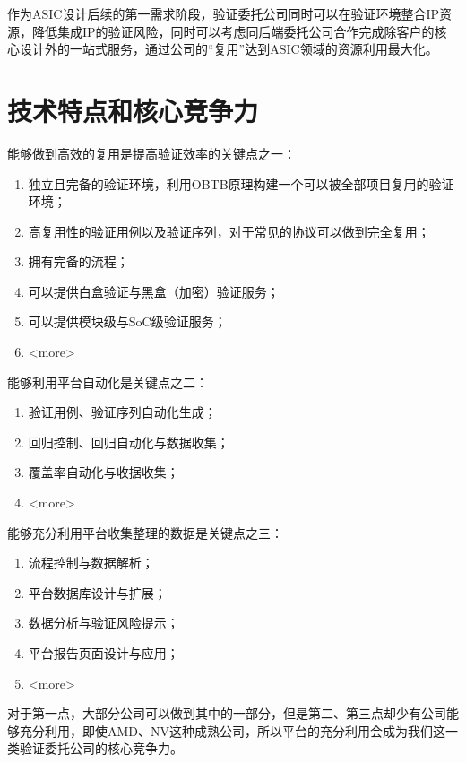 \documentclass[a4paper,11pt]{article}
\begin{document}
作为ASIC设计后续的第一需求阶段，验证委托公司同时可以在验证环境整合IP资源，降低集成IP的验证风险，同时可以考虑同后端委托公司合作完成除客户的核心设计外的一站式服务，通过公司的“复用”达到ASIC领域的资源利用最大化。
\pagebreak

\section{技术特点和核心竞争力}
能够做到高效的复用是提高验证效率的关键点之一：
\begin{enumerate}
\item 独立且完备的验证环境，利用OBTB原理构建一个可以被全部项目复用的验证环境；
\item 高复用性的验证用例以及验证序列，对于常见的协议可以做到完全复用；
\item 拥有完备的流程；
\item 可以提供白盒验证与黑盒（加密）验证服务；
\item 可以提供模块级与SoC级验证服务；
\item <more>
\end{enumerate}

能够利用平台自动化是关键点之二：
\begin{enumerate}
\item 验证用例、验证序列自动化生成；
\item 回归控制、回归自动化与数据收集；
\item 覆盖率自动化与收据收集；
\item <more>
\end{enumerate}

能够充分利用平台收集整理的数据是关键点之三：
\begin{enumerate}
\item 流程控制与数据解析；
\item 平台数据库设计与扩展；
\item 数据分析与验证风险提示；
\item 平台报告页面设计与应用；
\item <more>
\end{enumerate}

对于第一点，大部分公司可以做到其中的一部分，但是第二、第三点却少有公司能够充分利用，即使AMD、NV这种成熟公司，所以平台的充分利用会成为我们这一类验证委托公司的核心竞争力。
\pagebreak
\end{document}
